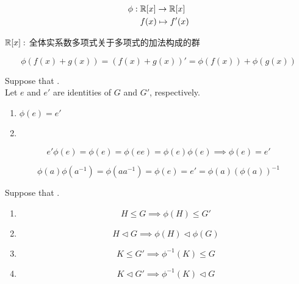 \begin{frame}{}
  \begin{align*}
    \phi:\; & \mathbb{R}[x] \to \mathbb{R}[x] \\
            & f(x) \mapsto f'(x)
  \end{align*}

  \vspace{0.30cm}
  \begin{center}
    $\mathbb{R}[x]:$ 全体实系数多项式关于多项式的加法构成的群
  \end{center}

  \[
    \phi(f(x) + g(x)) = (f(x) + g(x))' = \phi(f(x)) + \phi(g(x))
  \]
\end{frame}

\begin{frame}{}
  \begin{theorem}
    Suppose that . \\
    Let $e$ and $e'$ are identities of $G$ and $G'$, respectively.

    \begin{enumerate}[(1)]
      \setlength{\itemsep}{6pt}
      \item $\phi(e) = e'$
      \item {}
    \end{enumerate}
  \end{theorem}

  \pause
  \[
    e' \phi(e) = \phi(e) = \phi(e e) = \phi(e) \phi(e) \implies \phi(e) = e'
  \]

  \pause
  \[
    \phi(a)\phi(a^{-1}) = \phi(aa^{-1}) = \phi(e) = e' = \phi(a)(\phi(a))^{-1}
  \]
\end{frame}

\begin{frame}
  \begin{theorem}
    Suppose that . \\
    \begin{enumerate}[(1)]
      \item
        \[
          H \le G \implies \phi(H) \le G'
        \]
      \item
        \[
          H \triangleleft G \implies \phi(H) \triangleleft \phi(G)
        \]
      \pause
      \item
        \[
          K \le G' \implies \phi^{-1}(K) \le G
        \]
      \item
        \[
          K \triangleleft G' \implies \phi^{-1}(K) \triangleleft G
        \]
    \end{enumerate}
  \end{theorem}
\end{frame}

